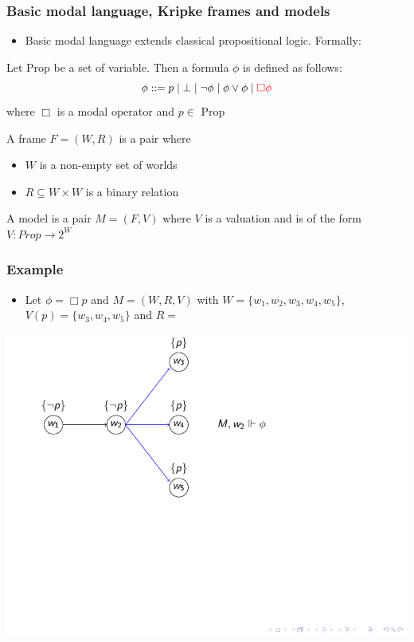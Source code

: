 \documentclass[hyperref={pdfpagelabels=false},t,10pt]{beamer}
\begin{document}
\begin{frame}
  \frametitle{Basic modal language, Kripke frames and models}
  \begin{itemize}
    \item Basic modal language extends classical propositional logic. Formally:
  \end{itemize}
    
    \begin{definition}
      Let Prop be a set of variable. Then a formula $\phi$ is defined as follows:
          $$\phi ::= p \mid \bot \mid \neg \phi \mid \phi \lor \phi \mid \textcolor{red}{\Box \phi}$$
           where $\Box$ is a modal operator and $p \in$ Prop  
    \end{definition}
     \pause

    \begin{definition}
    A frame $F = (W,R)$ is a pair where   
    \begin{itemize}
      \item $W$ is a non-empty set of worlds
      \item $R \subseteq W \times W $ is a binary relation
    \end{itemize}

    A model is a pair $M = (F,V)$ where $V$ is a valuation and is of the form $V : Prop \rightarrow 2^W$


    \end{definition}

\end{frame}

\begin{frame}
  \frametitle{Example}
  \begin{itemize}
    \item Let $\phi = \Box p$ and $M = (W,R,V)$ with $W = \{w_1,w_2,w_3,w_4,w_5\}$, $V(p) = \{w_3,w_4,w_5\}$ and $R = $
  \end{itemize}
  \centering
  \includegraphics[width=1\textwidth]{Example1.pdf}
\end{frame}
\end{document}
